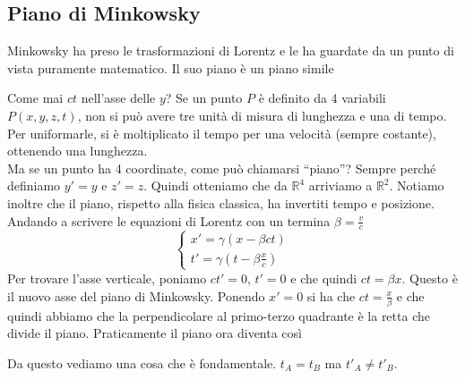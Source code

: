 \subsection{Piano di Minkowsky}
Minkowsky ha preso le trasformazioni di Lorentz e le ha guardate da un punto di vista puramente
matematico. Il suo piano è un piano simile
\begin{center}
\end{center}
Come mai $ct$ nell'asse delle $y$? Se un punto $P$ è definito da 4 variabili $P(x,y,z,t)$, non si
può avere tre unità di misura di lunghezza e una di tempo. Per uniformarle, si è moltiplicato il
tempo per una velocità (sempre costante), ottenendo una lunghezza.\\
Ma se un punto ha 4 coordinate, come può chiamarsi ``piano''? Sempre perché definiamo $y'=y$ e
$z'=z$. Quindi otteniamo che da $\mathbb{R}^4$ arriviamo a $\mathbb{R}^2$. Notiamo inoltre che il
piano, rispetto alla fisica classica, ha invertiti tempo e posizione.\\ [\baselineskip]
Andando a scrivere le equazioni di Lorentz con un termina $\beta = \frac{v}{c}$
\begin{equation*}
  \begin{cases}
    x' =\gamma(x-\beta ct)\\
    t'=\gamma\left(t-\beta\frac{x}{c}\right)
  \end{cases}
\end{equation*}
Per trovare l'asse verticale, poniamo $ct'=0$, $t'=0$ e che quindi $ct = \beta x$. Questo è il 
nuovo asse del piano di Minkowsky. Ponendo $x'=0$ si ha che $ct=\frac{x}{\beta}$ e che quindi 
abbiamo che la perpendicolare al primo-terzo quadrante è la retta che divide il piano. Praticamente
il piano ora diventa così
\begin{center}
\end{center}
Da questo vediamo una cosa che è fondamentale. $t_A=t_B$ ma $t'_A\neq t'_B$.

